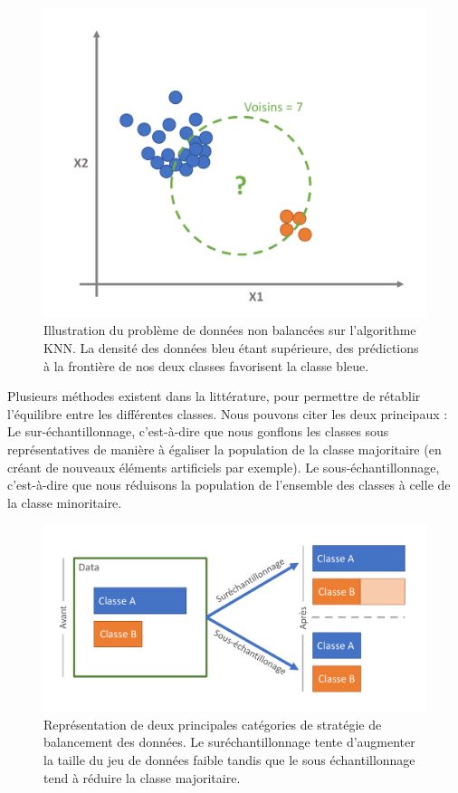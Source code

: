 \begin{figure}[H]
    \centering
    \includegraphics[width=\linewidth]{contents/chapter_3/resources/unbalanced.pdf}
    \caption{Illustration du problème de données non balancées sur l’algorithme KNN. La densité des données bleu étant supérieure, des prédictions à la frontière de nos deux classes favorisent la classe bleue.}
    \label{fig:unbalanced}
\end{figure}

Plusieurs méthodes existent dans la littérature, pour permettre de rétablir l’équilibre entre les différentes classes. Nous pouvons citer les deux principaux :
	Le sur-échantillonnage, c’est-à-dire que nous gonflons les classes sous représentatives de manière à égaliser la population de la classe majoritaire (en créant de nouveaux éléments artificiels par exemple).
	Le sous-échantillonnage, c’est-à-dire que nous réduisons la population de l’ensemble des classes à celle de la classe minoritaire.
 
\begin{figure}[H]
    \centering
    \includegraphics[width=\linewidth]{contents/chapter_3/resources/balancement_strategies.pdf}
    \caption{Représentation de deux principales catégories de stratégie de balancement des données. Le suréchantillonnage tente d’augmenter la taille du jeu de données faible tandis que le sous échantillonnage tend à réduire la classe majoritaire. }
    \label{fig:balancement_strategies}
\end{figure}

